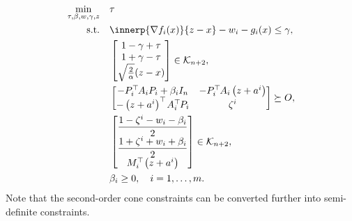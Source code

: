 \documentclass[../../main]{subfiles}
\begin{document}
\begin{equation} \label{eq:sdp}
    \begin{aligned}
        \min_{\tau, \beta, w, \gamma, z} \quad & \tau                                                      \\
        \st    \quad                           & \innerp{\nabla f_i(x)}{z - x} - w_i - g_i(x) \leq \gamma, \\
                                               & \begin{bmatrix} 1 - \gamma + \tau \\
                                                     1 + \gamma - \tau \\
                                                     \sqrt{\frac{2}{\alpha}} (z - x)
                                                 \end{bmatrix} \in \mathcal{K}_{n + 2},                    \\
                                               &
        \begin{bmatrix}
            -P_i^\T A_i P_i + \beta_i I_n       & -P_i^\T A_i \left(z + a^i\right) \\
            -\left(z + a^i\right)^\T A_i^\T P_i & \zeta^i
        \end{bmatrix} \succeq
        O,                                                                                                 \\
                                               & \begin{bmatrix} \dfrac{1 - \zeta^i - w_i - \beta_i}{2} \\
                                                     \dfrac{1 + \zeta^i + w_i + \beta_i}{2} \\
                                                     M_i^\T \left(z + a^i\right)
                                                 \end{bmatrix} \in \mathcal{K}_{n + 2},    \\
                                               & \beta_i \geq 0,  \quad i = 1,\ldots,m.
    \end{aligned}
\end{equation}
Note that the second-order cone constraints can be converted further into semi-definite constraints.
\end{document}
